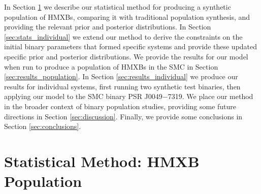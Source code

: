 \documentclass[12pt, preprint]{aastex}
\begin{document}
In Section \ref{sec:stats_population} we describe our statistical method for producing a synthetic population of HMXBs, comparing it with traditional population synthesis, and providing the relevant prior and posterior distributions. In Section \ref{sec:stats_individual} we extend our method to derive the constraints on the initial binary parameters that formed specific systems and provide these updated specific prior and posterior distributions. We provide the results for our model when run to produce a population of HMXBs in the SMC in Section \ref{sec:results_population}. In Section \ref{sec:results_individual} we produce our results for individual systems, first running two synthetic test binaries, then applying our model to the SMC binary PSR J0049$-$7319. We place our method in the broader context of binary population studies, providing some future directions in Section \ref{sec:discussion}. Finally, we provide some conclusions in Section \ref{sec:conclusions}.

\section{Statistical Method: HMXB Population} \label{sec:stats_population}
\end{document}
